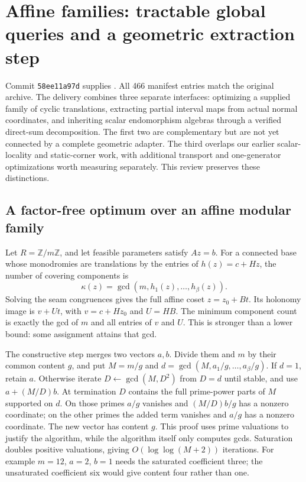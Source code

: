 \section{Affine families: tractable global queries and a geometric extraction step}
\label{sec:affine-families-review}

Commit \texttt{58ee11a97d} supplies
. All 466 manifest
entries match the original archive. The delivery combines three separate
interfaces: optimizing a supplied family of cyclic translations, extracting
partial interval maps from actual normal coordinates, and inheriting scalar
endomorphism algebras through a verified direct-sum decomposition. The first
two are complementary but are not yet connected by a complete geometric
adapter. The third overlaps our earlier scalar-locality and static-corner
work, with additional transport and one-generator optimizations worth
measuring separately. This review preserves these distinctions.

\subsection{A factor-free optimum over an affine modular family}

Let $R=\mathbb Z/m\mathbb Z$, and let feasible parameters satisfy $Az=b$.
For a connected base whose monodromies are translations by the entries of
$h(z)=c+Hz$, the number of covering components is
\[
 \kappa(z)=\gcd(m,h_1(z),\ldots,h_\beta(z)).
\]
Solving the seam congruences gives the full affine coset $z=z_0+Bt$.
Its holonomy image is $v+Ut$, with $v=c+Hz_0$ and $U=HB$. The minimum
component count is exactly the gcd of $m$ and all entries of $v$ and $U$.
This is stronger than a lower bound: some assignment attains that gcd.

The constructive step merges two vectors $a,b$. Divide them and $m$ by
their common content $g$, and put $M=m/g$ and
$d=\gcd(M,a_1/g,\ldots,a_\beta/g)$. If $d=1$, retain $a$. Otherwise
iterate $D\leftarrow\gcd(M,D^2)$ from $D=d$ until stable, and use
$a+(M/D)b$. At termination $D$ contains the full prime-power parts of
$M$ supported on $d$. On those primes $a/g$ vanishes and $(M/D)b/g$
has a nonzero coordinate; on the other primes the added term vanishes
and $a/g$ has a nonzero coordinate. The new vector has content $g$.
This proof uses prime valuations to justify the algorithm, while the
algorithm itself only computes gcds. Saturation doubles positive
valuations, giving $O(\log\log(M+2))$ iterations. For example $m=12$,
$a=2$, $b=1$ needs the saturated coefficient three; the unsaturated
coefficient six would give content four rather than one.

